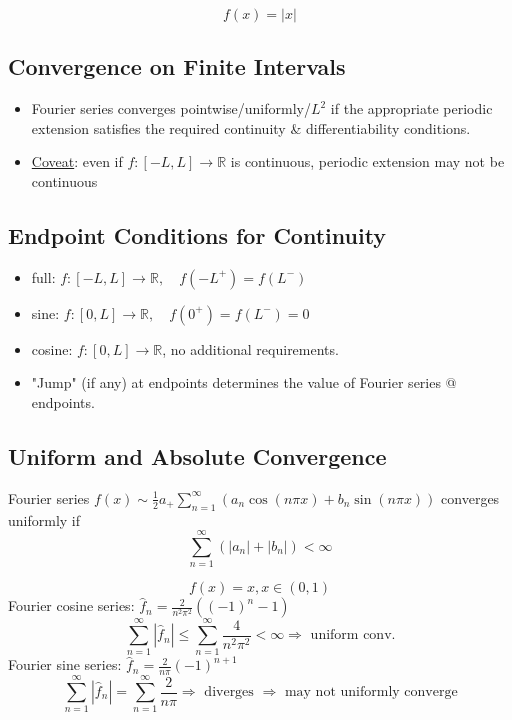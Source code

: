\begin{example}
    \[f(x) = \left\lvert x \right\rvert \]
\end{example}

\subsection{Convergence on Finite Intervals}
\begin{itemize}
    \item Fourier series converges pointwise/uniformly/$L^2$ if the appropriate periodic extension satisfies the required continuity \& differentiability conditions.
    \item \underline{Coveat}: even if $f:[-L, L] \to \mathbb{R}$ is continuous, periodic extension may not be continuous
\end{itemize}

\subsection{Endpoint Conditions for Continuity}
\begin{itemize}
    \item full: $f:[-L, L] \to \mathbb{R}, \quad f(-L^+) = f(L^-) $
    \item sine: $f:[0,L] \to \mathbb{R}, \quad f(0^+) = f(L^-) = 0$
    \item cosine: $f:[0, L] \to \mathbb{R}$, no additional requirements.
    \item "Jump" (if any) at endpoints determines the value of Fourier series @ endpoints.
\end{itemize}


\subsection{Uniform and Absolute Convergence}
\begin{theorem}
    Fourier series $f(x)\sim \frac{1}{2}a_ + \sum_{n=1}^{\infty} (a_n \cos(n\pi x) + b_n \sin(n \pi x))$ converges uniformly if
    \[\sum_{n=1}^{\infty} (\left\lvert a_n\right\rvert + \left\lvert b_n\right\rvert ) < \infty\]
\end{theorem}
\begin{example}
    \[f(x) = x, x\in(0,1)\]
    Fourier cosine series: $\hat{f}_n = \frac{2}{n^2 \pi^2} ((-1)^n -1)$
    \[\sum_{n=1}^{\infty} \left\lvert \hat{f}_n\right\rvert \leq \sum_{n=1}^{\infty} \frac{4}{n^2 \pi^2} < \infty \Rightarrow \text{ uniform conv.}\]
    Fourier sine series: $\hat{f}_n = \frac{2}{n\pi} (-1)^{n+1}$
    \[\sum_{n=1}^{\infty}\left\lvert \hat{f}_n\right\rvert = \sum_{n=1}^{\infty}\frac{2}{n\pi} \Rightarrow \text{ diverges } \Rightarrow \text{ may not uniformly converge}\]
\end{example}

